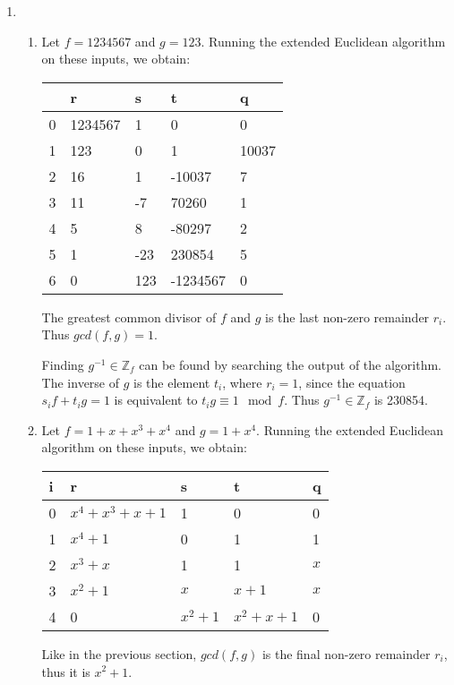 \documentclass[11pt,a4paper]{article}
\begin{document}
\begin{enumerate}
	\item
	      \begin{enumerate}
		      \item Let  $f = 1234567$ and $g = 123$. Running the extended Euclidean algorithm on these inputs, we obtain:
		            \begin{center}
			            \begin{tabular}{l|l|l|l|l}
				              & r       & s   & t        & q     \\
				            \hline
				            0 & 1234567 & 1   & 0        & 0     \\
				            1 & 123     & 0   & 1        & 10037 \\
				            2 & 16      & 1   & -10037   & 7     \\
				            3 & 11      & -7  & 70260    & 1     \\
				            4 & 5       & 8   & -80297   & 2     \\
				            5 & 1       & -23 & 230854   & 5     \\
				            6 & 0       & 123 & -1234567 & 0     \\
			            \end{tabular}
		            \end{center}

		            The greatest common divisor of $f$ and $g$ is the last non-zero remainder $r_i$. Thus $gcd(f, g) = 1$.

		            Finding $g^{-1} \in \mathbb{Z}_f$ can be found by searching the output of the algorithm. The
		            inverse of $g$ is the element $t_i$, where $r_i = 1$, since the equation $s_if + t_ig = 1$ is
		            equivalent to $t_ig \equiv 1 \mod{f}$. Thus $g^{-1}\in \mathbb{Z}_f$ is 230854.

		      \item Let  $f = 1 + x + x^3 + x^4$ and $g = 1 + x^4$. Running the extended Euclidean algorithm on these inputs, we obtain:
		            \begin{center}
			            \begin{tabular}{l|l|l|l|l}
				            i & r                   & s         & t             & q   \\
				            \hline
				            0 & $x^4 + x^3 + x + 1$ & 1         & 0             & 0   \\
				            1 & $x^4 + 1$           & 0         & 1             & 1   \\
				            2 & $x^3 + x$           & 1         & 1             & $x$ \\
				            3 & $x^2 + 1$           & $x$       & $x + 1$       & $x$ \\
				            4 & 0                   & $x^2 + 1$ & $x^2 + x + 1$ & 0   \\
			            \end{tabular}
		            \end{center}
		            Like in the previous section, $gcd(f, g)$ is the final non-zero remainder $r_i$, thus it is $x^2 + 1$.
	      \end{enumerate}


\end{enumerate}
\end{document}
